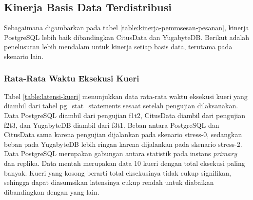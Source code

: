 \subsection{Kinerja Basis Data Terdistribusi}

Sebagaimana digambarkan pada tabel \ref{table:kinerja-pemrosesan-pesanan}, kinerja PostgreSQL lebih baik dibandingkan CitusData dan YugabyteDB. Berikut adalah penelusuran lebih mendalam untuk kinerja setiap basis data, terutama pada skenario lain.

\subsubsection{Rata-Rata Waktu Eksekusi Kueri}

Tabel \ref{table:latensi-kueri} menunjukkan data rata-rata waktu eksekusi kueri yang diambil dari tabel pg\_stat\_statements sesaat setelah pengujian dilaksanakan. Data PostgreSQL diambil dari pengujian f1t2, CitusData diambil dari pengujian f2t3, dan YugabyteDB diambil dari f3t1. Beban antara PostgreSQL dan CitusData sama karena pengujian dijalankan pada skenario stress-0, sedangkan beban pada YugabyteDB lebih ringan karena dijalankan pada skenario stress-2. Data PostgreSQL merupakan gabungan antara statistik pada instans \textit{primary} dan replika. Data mentah merupakan data 10 kueri dengan total eksekusi paling banyak. Kueri yang kosong berarti total eksekusinya tidak cukup signifikan, sehingga dapat diasumsikan latensinya cukup rendah untuk diabaikan dibandingkan dengan yang lain.

